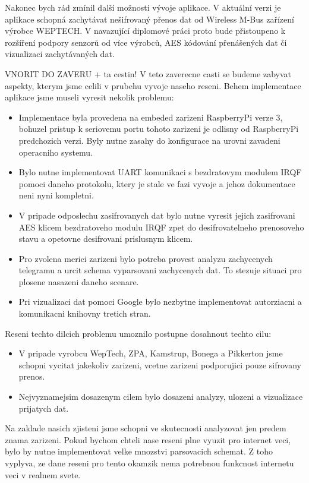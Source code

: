 Nakonec bych rád zmínil další možnosti vývoje aplikace. V aktuální verzi je aplikace schopná zachytávat nešifrovaný přenos dat od Wireless M-Bus zařízení výrobce WEPTECH. V navazující diplomové práci proto bude přistoupeno k rozšíření podpory senzorů od více výrobců, AES kódování přenášených dat či vizualizaci zachytávaných dat.



\colorbox[rgb]{1,0,0}{VNORIT DO ZAVERU + ta cestin!}
V teto zaverecne casti se budeme zabyvat aspekty, kterym jsme celili v prubehu vyvoje naseho reseni. 
Behem implementace aplikace jsme museli vyresit nekolik problemu:
\begin{itemize}
	\item Implementace byla provedena na embeded zarizeni RaspberryPi verze 3, bohuzel pristup k seriovemu portu tohoto zarizeni je odlisny od RaspberryPi predchozich verzi. Byly nutne zasahy do konfigurace na urovni zavadeni operacniho systemu.
	\item Bylo nutne implementovat UART komunikaci s bezdratovym modulem IRQF pomoci daneho protokolu, ktery je stale ve fazi vyvoje a jehoz dokumentace neni nyni kompletni.
	\item V pripade odposlechu zasifrovanych dat bylo nutne vyresit jejich zasifrovani AES klicem bezdratoveho modulu IRQF zpet do desifrovatelneho prenosoveho stavu a opetovne desifrovani prislusnym klicem.
	\item Pro zvolena merici zarizeni bylo potreba provest analyzu zachycenych telegramu a urcit schema vyparsovani zachycenych dat. To stezuje situaci pro plosene nasazeni daneho scenare.
	\item Pri vizualizaci dat pomoci Google bylo nezbytne implementovat autorziacni a komunikacni knihovny tretich stran.
\end{itemize}
Reseni techto dilcich problemu umoznilo postupne dosahnout techto cilu:
\begin{itemize}
	\item V pripade vyrobcu WepTech, ZPA, Kamstrup, Bonega a Pikkerton jsme schopni vycitat jakekoliv zarizeni, vcetne zarizeni podporujici pouze sifrovany prenos.	
	\item Nejvyznamejsim dosazenym cilem bylo dosazeni analyzy, ulozeni a vizualizace prijatych dat.
\end{itemize}

Na zaklade nasich zjisteni jsme schopni ve skutecnosti analyzovat jen predem znama zarizeni. Pokud bychom chteli nase reseni plne vyuzit pro internet veci, bylo by nutne implementovat velke mnozstvi parsovacich schemat. Z toho vyplyva, ze dane reseni pro tento okamzik nema potrebnou funkcnost internetu veci v realnem svete.


